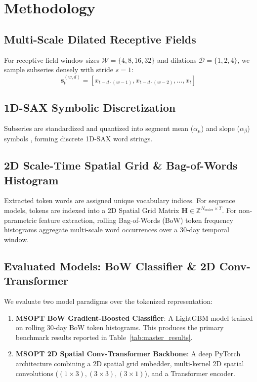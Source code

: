\documentclass[10pt,journal,compsoc]{IEEEtran}
\begin{document}
\section{Methodology}
\subsection{Multi-Scale Dilated Receptive Fields}
For receptive field window sizes $\mathcal{W} = \{4, 8, 16, 32\}$ and dilations $\mathcal{D} = \{1, 2, 4\}$, we sample subseries densely with stride $s=1$:
\begin{equation}
\mathbf{s}_{t}^{(w,d)} = \left[ x_{t - d \cdot (w-1)}, x_{t - d \cdot (w-2)}, \dots, x_{t} \right]
\end{equation}

\subsection{1D-SAX Symbolic Discretization}
Subseries are standardized and quantized into segment mean ($\alpha_{\mu}$) and slope ($\alpha_{\beta}$) symbols \cite{lin2003sax}, forming discrete 1D-SAX word strings.

\subsection{2D Scale-Time Spatial Grid & Bag-of-Words Histogram}
Extracted token words are assigned unique vocabulary indices. For sequence models, tokens are indexed into a 2D Spatial Grid Matrix $\mathbf{H} \in \mathbb{Z}^{N_{\text{scales}} \times T}$. For non-parametric feature extraction, rolling Bag-of-Words (BoW) token frequency histograms aggregate multi-scale word occurrences over a 30-day temporal window.

\subsection{Evaluated Models: BoW Classifier \& 2D Conv-Transformer}
We evaluate two model paradigms over the tokenized representation:
\begin{enumerate}
    \item \textbf{MSOPT BoW Gradient-Boosted Classifier}: A LightGBM model trained on rolling 30-day BoW token histograms. This produces the primary benchmark results reported in Table~\ref{tab:master_results}.
    \item \textbf{MSOPT 2D Spatial Conv-Transformer Backbone}: A deep PyTorch architecture combining a 2D spatial grid embedder, multi-kernel 2D spatial convolutions ($(1\times3), (3\times3), (3\times1)$), and a Transformer encoder.
\end{enumerate}
\end{document}

